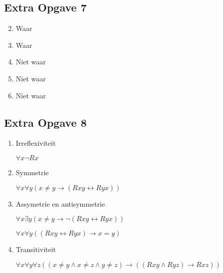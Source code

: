\documentclass[11pt]{article}
\newcommand{\E}{\exists}
\newcommand{\A}{\forall}
\begin{document}
\subsection*{Extra Opgave 7}
\begin{enumerate}[label=\roman*]
  \setcounter{enumi}{1}
  \item Waar  %

  \setcounter{enumi}{3}
  \item Waar

  \setcounter{enumi}{5}
  \item Niet waar

  \setcounter{enumi}{7}
  \item Niet waar

  \setcounter{enumi}{9}
  \item Niet waar

\end{enumerate}


\subsection*{Extra Opgave 8}
\begin{enumerate}
  \item Irreflexiviteit

  $\A x \neg Rx$

  \item Symmetrie

  $\A x \A y (x \neq y \rightarrow (Rxy \leftrightarrow Ryx))$

  \item Assymetrie en antisymmetrie

  $\A x \E y (x \neq y \rightarrow \neg(Rxy \leftrightarrow Ryx))$

  $\A x \A y ((Rxy \leftrightarrow Ryx) \rightarrow x = y)$

  \item Transitiviteit

  $\A x \A y \A z((x \neq y \wedge x \neq z \wedge y \neq z)
  \rightarrow ((Rxy \wedge Ryz) \rightarrow Rxz))$

\end{enumerate}
\end{document}
